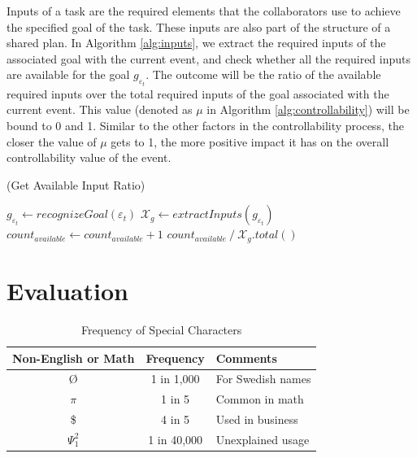 \documentclass{aamas2016}
\begin{document}
Inputs of a task are the required elements that the collaborators use to
achieve the specified goal of the task. These inputs are also part of the
structure of a shared plan. In Algorithm \ref{alg:inputs}, we extract the
required inputs of the associated goal with the current event, and check whether
all the required inputs are available for the goal $\mathit{g}_{\varepsilon_t}$.
The outcome will be the ratio of the available required inputs over the total
required inputs of the goal associated with the current event. This value
(denoted as $\mu$ in Algorithm \ref{alg:controllability}) will be bound to 0 and
1. Similar to the other factors in the controllability process, the closer the
value of $\mu$ gets to 1, the more positive impact it has on the overall
controllability value of the event.

\renewcommand\thealgorithm{4\alph{algorithm}}
\setcounter{algorithm}{3}

\begin{algorithm}
	\caption{(Get Available Input Ratio)}
	\label{alg:inputs}
	\begin{algorithmic}[1]
			\Statex
			\State $\mathit{g}_{\varepsilon_t} \gets
			\textit{recognizeGoal}{(\varepsilon_t)}$
			\Statex
				\State {}
			\EndIf
			\Statex
			\State $\mathcal{X}_{\mathit{g}} \gets
			\textit{extractInputs}{(\mathit{g}_{\varepsilon_t})}$
			\Statex
					\State $count_{available} \gets count_{available} + 1$
				\EndIf
			\EndFor
			\Statex
			\State \Return
			${count_{available} \mathbin{/} \mathcal{X}_{\mathit{g}}.total()}$
		\EndFunction 
	\end{algorithmic}
\end{algorithm}

\section{Evaluation}
\label{sec:user-study}

\begin{table}
\centering
\caption{Frequency of Special Characters}
\begin{tabular}{|c|c|l|} \hline
Non-English or Math&Frequency&Comments\\ \hline
\O & 1 in 1,000& For Swedish names\\ \hline
$\pi$ & 1 in 5& Common in math\\ \hline
\$ & 4 in 5 & Used in business\\ \hline
$\Psi^2_1$ & 1 in 40,000& Unexplained usage\\
\hline\end{tabular}
\end{table}
\end{document}

